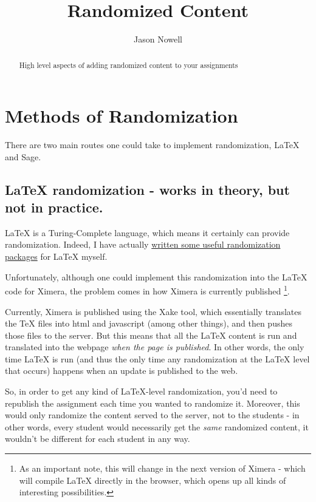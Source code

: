 \documentclass{ximera}
\title{Randomized Content}
\author{Jason Nowell}
\begin{document}
\begin{abstract}
    High level aspects of adding randomized content to your assignments
\end{abstract}
\maketitle

\section*{Methods of Randomization}
    There are two main routes one could take to implement randomization, LaTeX and Sage. 
    
    \subsection*{LaTeX randomization - works in theory, but not in practice.}
        \LaTeX{} is a Turing-Complete language, which means it certainly can provide randomization. Indeed, I have actually \href{https://github.com/xronosuf/Ximera-Latex-Package/blob/master/OptionalPackages/randomize.sty}{written some useful randomization packages} for LaTeX myself.
        
        Unfortunately, although one could implement this randomization into the LaTeX code for Ximera, the problem comes in how Ximera is currently published%
        \footnote{As an important note, this will change in the next version of Ximera - which will compile LaTeX directly in the browser, which opens up all kinds of interesting possibilities.}.
        
        Currently, Ximera is published using the Xake tool, which essentially translates the TeX files into html and javascript (among other things), and then pushes those files to the server. But this means that all the LaTeX content is run and translated into the webpage \textit{when the page is published}. In other words, the only time LaTeX is run (and thus the only time any randomization at the LaTeX level that occurs) happens when an update is published to the web.
        
        So, in order to get any kind of LaTeX-level randomization, you'd need to republish the assignment each time you wanted to randomize it. Moreover, this would only randomize the content served to the server, not to the students - in other words, every student would necessarily get the \textit{same} randomized content, it wouldn't be different for each student in any way.
        
\end{document}
